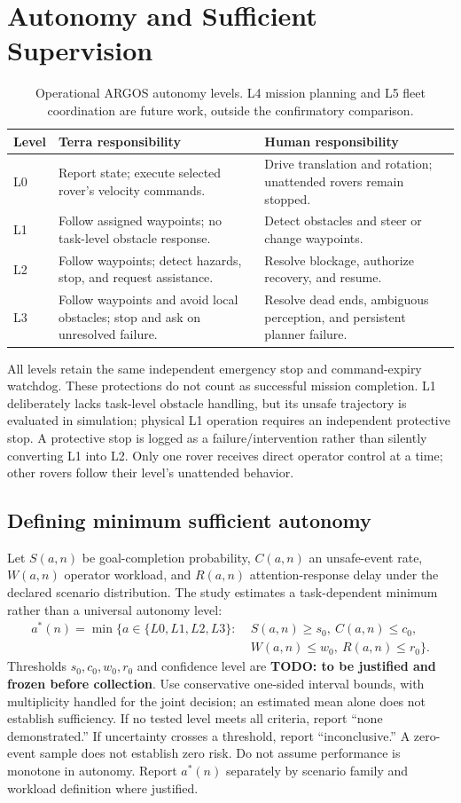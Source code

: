 \documentclass[12pt,oneside]{report}
\begin{document}
\chapter{Autonomy and Sufficient Supervision}
\begin{table}[htbp]\centering\small
\begin{tabular}{p{.09\linewidth}p{.37\linewidth}p{.43\linewidth}}\toprule
Level & Terra responsibility & Human responsibility \\\midrule
L0 & Report state; execute selected rover's velocity commands. & Drive translation and rotation; unattended rovers remain stopped. \\
L1 & Follow assigned waypoints; no task-level obstacle response. & Detect obstacles and steer or change waypoints. \\
L2 & Follow waypoints; detect hazards, stop, and request assistance. & Resolve blockage, authorize recovery, and resume. \\
L3 & Follow waypoints and avoid local obstacles; stop and ask on unresolved failure. & Resolve dead ends, ambiguous perception, and persistent planner failure. \\\bottomrule
\end{tabular}\caption{Operational ARGOS autonomy levels. L4 mission planning and L5 fleet coordination are future work, outside the confirmatory comparison.}\end{table}
All levels retain the same independent emergency stop and command-expiry watchdog. These protections do not count as successful mission completion. L1 deliberately lacks task-level obstacle handling, but its unsafe trajectory is evaluated in simulation; physical L1 operation requires an independent protective stop. A protective stop is logged as a failure/intervention rather than silently converting L1 into L2. Only one rover receives direct operator control at a time; other rovers follow their level's unattended behavior.
\section{Defining minimum sufficient autonomy}
Let $S(a,n)$ be goal-completion probability, $C(a,n)$ an unsafe-event rate, $W(a,n)$ operator workload, and $R(a,n)$ attention-response delay under the declared scenario distribution. The study estimates a task-dependent minimum rather than a universal autonomy level:
\[
\begin{aligned}
a^*(n)=\min\{a\in\{L0,L1,L2,L3\}:\;&S(a,n)\geq s_0,\ C(a,n)\leq c_0,\\
&W(a,n)\leq w_0,\ R(a,n)\leq r_0\}.
\end{aligned}
\]
Thresholds $s_0,c_0,w_0,r_0$ and confidence level are \textbf{TODO: to be justified and frozen before collection}. Use conservative one-sided interval bounds, with multiplicity handled for the joint decision; an estimated mean alone does not establish sufficiency. If no tested level meets all criteria, report ``none demonstrated.'' If uncertainty crosses a threshold, report ``inconclusive.'' A zero-event sample does not establish zero risk. Do not assume performance is monotone in autonomy. Report $a^*(n)$ separately by scenario family and workload definition where justified.
\end{document}
